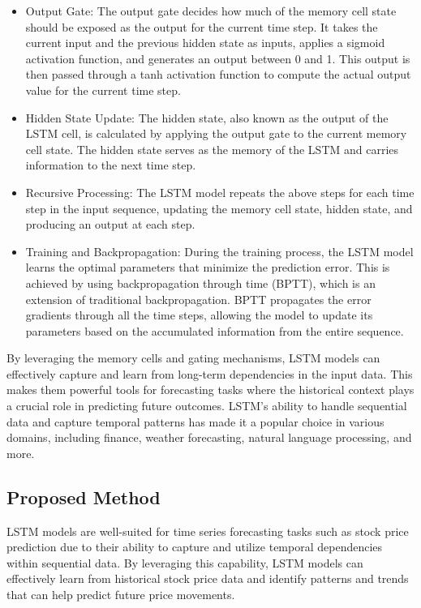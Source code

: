\documentclass[conference]{IEEEtran}
\begin{document}
\begin{itemize}
  \item Output Gate: The output gate decides how much of the memory cell state should be exposed as the output for the current time step. It takes the current input and the previous hidden state as inputs, applies a sigmoid activation function, and generates an output between 0 and 1. This output is then passed through a tanh activation function to compute the actual output value for the current time step.
  
  \item Hidden State Update: The hidden state, also known as the output of the LSTM cell, is calculated by applying the output gate to the current memory cell state. The hidden state serves as the memory of the LSTM and carries information to the next time step.
  
  \item Recursive Processing: The LSTM model repeats the above steps for each time step in the input sequence, updating the memory cell state, hidden state, and producing an output at each step.
  
  \item Training and Backpropagation: During the training process, the LSTM model learns the optimal parameters that minimize the prediction error. This is achieved by using backpropagation through time (BPTT), which is an extension of traditional backpropagation. BPTT propagates the error gradients through all the time steps, allowing the model to update its parameters based on the accumulated information from the entire sequence.
\end{itemize}

By leveraging the memory cells and gating mechanisms, LSTM models can effectively capture and learn from long-term dependencies in the input data. This makes them powerful tools for forecasting tasks where the historical context plays a crucial role in predicting future outcomes. LSTM's ability to handle sequential data and capture temporal patterns has made it a popular choice in various domains, including finance, weather forecasting, natural language processing, and more.

\subsection{Proposed Method}
LSTM models are well-suited for time series forecasting tasks such as stock price prediction due to their ability to capture and utilize temporal dependencies within sequential data. By leveraging this capability, LSTM models can effectively learn from historical stock price data and identify patterns and trends that can help predict future price movements.
\end{document}
